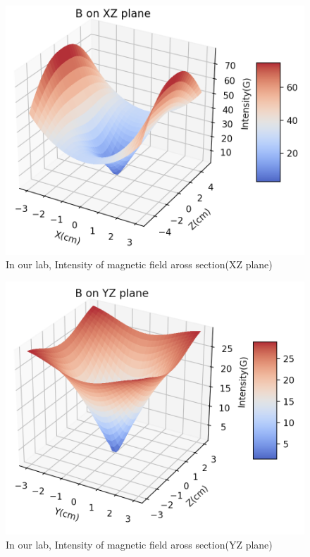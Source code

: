 \documentclass{article}
\begin{document}
\begin{figure}[h]
	\centering
	\includegraphics[scale=0.5]{OurXZ}
	\caption{In our lab, Intensity of magnetic field aross section(XZ plane)}
\end{figure}
\begin{figure}[h]
	\centering
	\includegraphics[scale=0.5]{OurYZ}
	\caption{In our lab, Intensity of magnetic field aross section(YZ plane)}
\end{figure}
\end{document}
